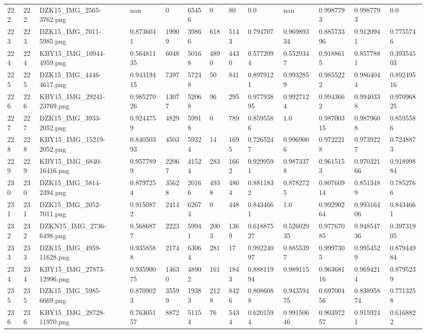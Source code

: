 \documentclass[11pt, a4paper, twoside]{report}
\begin{document}
\begin{longtable}[c]{@{}lllllllllllll@{}}
222 & 222 & DZK15\_IMG\_2565-3762.png & nan & 0 & 65456 & 0 & 80 & 0.0 & nan & 0.9987793 & 0.9987793 & 0.0 \\
223 & 223 & DZK15\_IMG\_7011-5985.png & 0.8736041 & 19909 & 39866 & 618 & 5143 & 0.794707 & 0.96989334 & 0.88573396 & 0.9120941 & 0.7755746 \\
224 & 224 & KBY15\_IMG\_10944-4959.png & 0.56481135 & 6048 & 50168 & 4890 & 4430 & 0.5772094 & 0.5529347 & 0.9188615 & 0.8577881 & 0.39354503 \\
225 & 225 & DZK15\_IMG\_4446-4617.png & 0.94319415 & 7397 & 57248 & 50 & 841 & 0.8979121 & 0.9932859 & 0.9855222 & 0.9864044 & 0.89249516 \\
226 & 226 & KBY15\_IMG\_29241-23769.png & 0.98527026 & 13077 & 52068 & 96 & 295 & 0.97793895 & 0.9927124 & 0.9943662 & 0.9940338 & 0.97096825 \\
227 & 227 & DZK15\_IMG\_3933-2052.png & 0.9244759 & 4829 & 59918 & 0 & 789 & 0.8595586 & 1.0 & 0.98700315 & 0.9879608 & 0.8595586 \\
228 & 228 & KBY15\_IMG\_15219-2052.png & 0.84050393 & 4503 & 59324 & 14 & 1695 & 0.7265247 & 0.9969006 & 0.9722218 & 0.9739227 & 0.7248873 \\
229 & 229 & KBY15\_IMG\_6840-16416.png & 0.9577899 & 22067 & 41524 & 283 & 1662 & 0.9299591 & 0.9873378 & 0.9615153 & 0.97032166 & 0.91899884 \\
230 & 230 & DZK15\_IMG\_5814-2394.png & 0.8797254 & 35628 & 20166 & 4938 & 4804 & 0.8811832 & 0.8782725 & 0.80760914 & 0.8513489 & 0.7852766 \\
231 & 231 & DZK15\_IMG\_2052-7011.png & 0.9150872 & 2414 & 62674 & 0 & 448 & 0.8434661 & 1.0 & 0.99290264 & 0.99316406 & 0.8434661 \\
232 & 232 & DZKN15\_IMG\_2736-6498.png & 0.5686877 & 2223 & 59941 & 2003 & 1369 & 0.61887527 & 0.52602935 & 0.97767085 & 0.94854736 & 0.39731905 \\
233 & 233 & DZK15\_IMG\_4959-11628.png & 0.9358588 & 2174 & 63064 & 281 & 17 & 0.99224097 & 0.8855397 & 0.9997305 & 0.9954529 & 0.87944984 \\
234 & 234 & KBY15\_IMG\_27873-12996.png & 0.93590075 & 14630 & 48902 & 161 & 1843 & 0.88811994 & 0.989115 & 0.96368116 & 0.9694214 & 0.8795239 \\
235 & 235 & DZK15\_IMG\_5985-6669.png & 0.8709023 & 35599 & 19383 & 2128 & 8426 & 0.8086088 & 0.94359475 & 0.69700456 & 0.83895874 & 0.7713258 \\
236 & 236 & KBY15\_IMG\_28728-11970.png & 0.76305157 & 8872 & 51154 & 76 & 5434 & 0.6201594 & 0.99150646 & 0.90397257 & 0.9159241 & 0.6168822 \\

\end{longtable}
\end{document}
